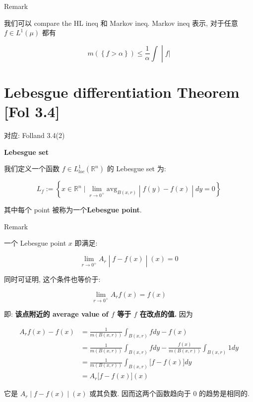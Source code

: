 \documentclass{qlnotes-export}
\begin{document}
\begin{qlremark}{Remark}

我们可以 compare the HL ineq 和 Markov ineq. Markov ineq 表示, 对于任意 \(f \in L^{1}(\mu)\) 都有

\[\left. m(\left\{ {f > \alpha} \right\}) \leq \frac{1}{\alpha}\int \middle| f| \right.\]

\end{qlremark}

\section{Lebesgue differentiation Theorem {[}Fol 3.4{]}}

对应: Folland 3.4(2)

\begin{definition}{\protect{}\label{kn-lebesgue-set}{\textbf{Lebesgue set}}}

我们定义一个函数 \(f \in L_{loc}^{1}({\mathbb{R}}^{n})\) 的 Lebesgue set 为:

\[L_{f} := \left\{ x \in {\mathbb{R}}^{n} \mid \lim\limits_{r\rightarrow 0^{+}}\text{avg}_{B(x,r)} \middle| f(y) - f(x) \middle| dy = 0 \right\}\]

其中每个 point 被称为一个\textbf{Lebesgue point}.

\end{definition}

\begin{qlremark}{Remark}

一个 Lebesgue point \(x\) 即满足:

\[\left. \lim\limits_{r\rightarrow 0^{+}}A_{r} \middle| f - f(x) \middle| (x) = 0 \right.\]

同时可证明, 这个条件也等价于:

\[\lim\limits_{r\rightarrow 0^{+}}A_{r}f(x) = f(x)\]

即: \textbf{该点附近的 average value of \(f\) 等于 \(f\) 在改点的值.} 因为

\[\begin{matrix}
{A_{r}f(x) - f(x)} & {= \frac{1}{m(B(x,r))}\int_{B(x,r)}f dy - f(x)} \\
 & {= \frac{1}{m(B(x,r))}\int_{B(x,r)}f dy - \frac{f(x)}{m(B(x,r))}\int_{B(x,r)}1 dy} \\
 & {= \frac{1}{m(B(x,r))}\int_{B(x,r)}\lbrack f - f(x)\rbrack dy} \\
 & {= A_{r}\lbrack f - f(x)\rbrack(x)}
\end{matrix}\]

它是 \(\left. A_{r} \middle| f - f(x) \middle| (x) \right.\) 或其负数. 因而这两个函数趋向于 0 的趋势是相同的.

\end{qlremark}
\end{document}
